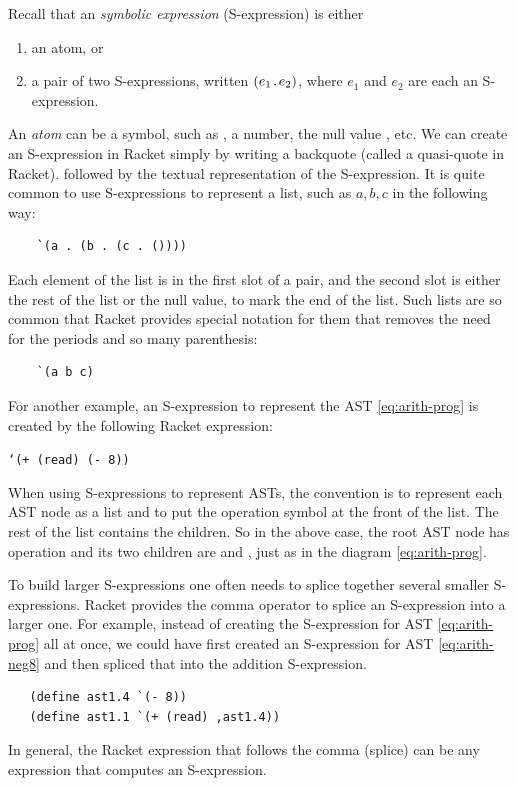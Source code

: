 \documentclass[11pt]{book}
\begin{document}
Recall that an \emph{symbolic expression} (S-expression) is either
\begin{enumerate}
\item an atom, or
\item a pair of two S-expressions, written $(e_1 \texttt{.} e_2)$,
    where $e_1$ and $e_2$ are each an S-expression.
\end{enumerate}
An \emph{atom} can be a symbol, such as , a number, the null
value , etc.
We can create an S-expression in Racket simply by writing a backquote
(called a quasi-quote in Racket).
followed by the textual representation of the S-expression.
It is quite common to use S-expressions
to represent a list, such as $a, b ,c$ in the following way:
\begin{lstlisting}
    `(a . (b . (c . ())))
\end{lstlisting}
Each element of the list is in the first slot of a pair, and the
second slot is either the rest of the list or the null value, to mark
the end of the list. Such lists are so common that Racket provides
special notation for them that removes the need for the periods
and so many parenthesis:
\begin{lstlisting}
    `(a b c)
\end{lstlisting}
For another example,
an S-expression to represent the AST \eqref{eq:arith-prog} is created
by the following Racket expression:
\begin{center}
\texttt{`(+ (read) (- 8))}
\end{center}
When using S-expressions to represent ASTs, the convention is to
represent each AST node as a list and to put the operation symbol at
the front of the list. The rest of the list contains the children.  So
in the above case, the root AST node has operation  and its
two children are  and , just as in the
diagram \eqref{eq:arith-prog}.

To build larger S-expressions one often needs to splice together
several smaller S-expressions. Racket provides the comma operator to
splice an S-expression into a larger one. For example, instead of
creating the S-expression for AST \eqref{eq:arith-prog} all at once,
we could have first created an S-expression for AST
\eqref{eq:arith-neg8} and then spliced that into the addition
S-expression.
\begin{lstlisting}
   (define ast1.4 `(- 8))
   (define ast1.1 `(+ (read) ,ast1.4))
\end{lstlisting}
In general, the Racket expression that follows the comma (splice)
can be any expression that computes an S-expression.
\end{document}
